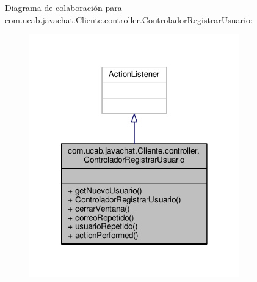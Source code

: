 Diagrama de colaboración para com.\-ucab.\-javachat.\-Cliente.\-controller.\-Controlador\-Registrar\-Usuario\-:
\nopagebreak
\begin{figure}[H]
\begin{center}
\leavevmode
\includegraphics[width=258pt]{d6/d1e/classcom_1_1ucab_1_1javachat_1_1_cliente_1_1controller_1_1_controlador_registrar_usuario__coll__graph}
\end{center}
\end{figure}
